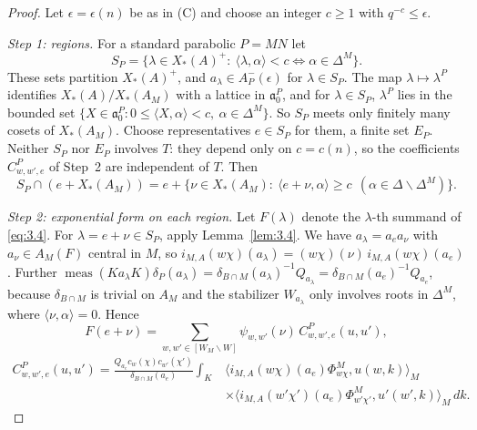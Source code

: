 \documentclass[12pt,letterpaper]{article}
\numberwithin{equation}{section}
\theoremstyle{plain}
\theoremstyle{remark}
\theoremstyle{plain}
\theoremstyle{definition}
\theoremstyle{remark}
\theoremstyle{remark}
\newcommand{\fa}{\mathfrak{a}}
\newcommand{\ip}[1]{\langle #1\rangle}
\DeclareMathOperator{\meas}{meas}
\newcommand{\Wrep}[1]{[W_{#1}\backslash W]}
\begin{document}
\begin{proof}
Let $\epsilon=\epsilon(n)$ be as in (C) and choose an integer $c\ge1$ with $q^{-c}\le\epsilon$.

\emph{Step 1: regions.} For a standard parabolic $P=MN$ let
\[
S_P=\{\lambda\in X_*(A)^+:\ \ip{\lambda,\alpha}<c\iff\alpha\in\Delta^M\}.
\]
These sets partition $X_*(A)^+$, and $a_\lambda\in A^-_P(\epsilon)$ for $\lambda\in S_P$. The map $\lambda\mapsto\lambda^P$ identifies $X_*(A)/X_*(A_M)$ with a lattice in $\fa_0^P$, and for $\lambda\in S_P$, $\lambda^P$ lies in the bounded set $\{X\in\fa_0^P:0\le\ip{X,\alpha}<c,\ \alpha\in\Delta^M\}$. So $S_P$ meets only finitely many cosets of $X_*(A_M)$. Choose representatives $e\in S_P$ for them, a finite set $E_P$. Neither $S_P$ nor $E_P$ involves $T$: they depend only on $c=c(n)$, so the coefficients $C^P_{w,w',e}$ of Step~2 are independent of $T$. Then
\[
S_P\cap(e+X_*(A_M))=e+\{\nu\in X_*(A_M):\ \ip{e+\nu,\alpha}\ge c\ \ (\alpha\in\Delta\smallsetminus\Delta^M)\}.
\]

\emph{Step 2: exponential form on each region.} Let $F(\lambda)$ denote the $\lambda$-th summand of \eqref{eq:3.4}. For $\lambda=e+\nu\in S_P$, apply Lemma~\ref{lem:3.4}. We have $a_\lambda=a_ea_\nu$ with $a_\nu\in A_M(F)$ central in $M$, so $i_{M,A}(w\chi)(a_\lambda)=(w\chi)(\nu)\,i_{M,A}(w\chi)(a_e)$. Further $\meas(Ka_\lambda K)\delta_P(a_\lambda)=\delta_{B\cap M}(a_\lambda)^{-1}Q_{a_\lambda}=\delta_{B\cap M}(a_e)^{-1}Q_{a_e}$, because $\delta_{B\cap M}$ is trivial on $A_M$ and the stabilizer $W_{a_\lambda}$ only involves roots in $\Delta^M$, where $\ip{\nu,\alpha}=0$. Hence
\[
F(e+\nu)=\sum_{w,w'\in\Wrep{M}}\psi_{w,w'}(\nu)\,C^P_{w,w',e}(u,u'),
\]
\[
\begin{aligned}
C^P_{w,w',e}(u,u')=\frac{Q_{a_e}c_w(\chi)c_{w'}(\chi')}{\delta_{B\cap M}(a_e)}\int_K&\ip{i_{M,A}(w\chi)(a_e)\Phi^M_{w\chi},u(w,k)}_M\\
&\times\ip{i_{M,A}(w'\chi')(a_e)\Phi^M_{w'\chi'},u'(w',k)}_M\,dk.
\end{aligned}
\]


\end{proof}
\end{document}
